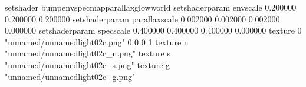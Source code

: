 setshader bumpenvspecmapparallaxglowworld
setshaderparam envscale 0.200000 0.200000 0.200000
setshaderparam parallaxscale 0.002000 0.002000 0.002000 0.000000
setshaderparam specscale 0.400000 0.400000 0.400000 0.000000
texture 0 "unnamed/unnamedlight02c.png" 0 0 0 1
texture n "unnamed/unnamedlight02c_n.png"
texture s "unnamed/unnamedlight02c_s.png"
texture g "unnamed/unnamedlight02c_g.png"
